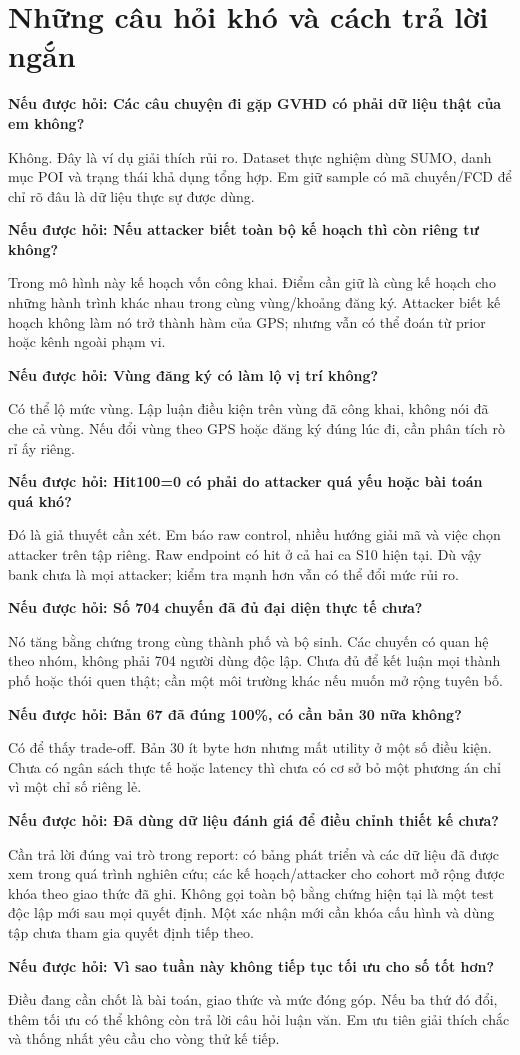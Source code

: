 \documentclass[10pt,a4paper]{article}
\newcommand{\ask}[2]{\par\textbf{Nếu được hỏi: #1}\par #2\par}
\newcommand{\guidepage}[1]{\clearpage\section{#1}}
\begin{document}
\guidepage{Những câu hỏi khó và cách trả lời ngắn}
\ask{Các câu chuyện đi gặp GVHD có phải dữ liệu thật của em không?}{Không. Đây là ví dụ giải thích rủi ro. Dataset thực nghiệm dùng SUMO, danh mục POI và trạng thái khả dụng tổng hợp. Em giữ sample có mã chuyến/FCD để chỉ rõ đâu là dữ liệu thực sự được dùng.}

\ask{Nếu attacker biết toàn bộ kế hoạch thì còn riêng tư không?}{Trong mô hình này kế hoạch vốn công khai. Điểm cần giữ là cùng kế hoạch cho những hành trình khác nhau trong cùng vùng/khoảng đăng ký. Attacker biết kế hoạch không làm nó trở thành hàm của GPS; nhưng vẫn có thể đoán từ prior hoặc kênh ngoài phạm vi.}

\ask{Vùng đăng ký có làm lộ vị trí không?}{Có thể lộ mức vùng. Lập luận điều kiện trên vùng đã công khai, không nói đã che cả vùng. Nếu đổi vùng theo GPS hoặc đăng ký đúng lúc đi, cần phân tích rò rỉ ấy riêng.}

\ask{Hit100=0 có phải do attacker quá yếu hoặc bài toán quá khó?}{Đó là giả thuyết cần xét. Em báo raw control, nhiều hướng giải mã và việc chọn attacker trên tập riêng. Raw endpoint có hit ở cả hai ca S10 hiện tại. Dù vậy bank chưa là mọi attacker; kiểm tra mạnh hơn vẫn có thể đổi mức rủi ro.}

\ask{Số 704 chuyến đã đủ đại diện thực tế chưa?}{Nó tăng bằng chứng trong cùng thành phố và bộ sinh. Các chuyến có quan hệ theo nhóm, không phải 704 người dùng độc lập. Chưa đủ để kết luận mọi thành phố hoặc thói quen thật; cần một môi trường khác nếu muốn mở rộng tuyên bố.}

\ask{Bản 67 đã đúng 100\%, có cần bản 30 nữa không?}{Có để thấy trade-off. Bản 30 ít byte hơn nhưng mất utility ở một số điều kiện. Chưa có ngân sách thực tế hoặc latency thì chưa có cơ sở bỏ một phương án chỉ vì một chỉ số riêng lẻ.}

\ask{Đã dùng dữ liệu đánh giá để điều chỉnh thiết kế chưa?}{Cần trả lời đúng vai trò trong report: có bảng phát triển và các dữ liệu đã được xem trong quá trình nghiên cứu; các kế hoạch/attacker cho cohort mở rộng được khóa theo giao thức đã ghi. Không gọi toàn bộ bằng chứng hiện tại là một test độc lập mới sau mọi quyết định. Một xác nhận mới cần khóa cấu hình và dùng tập chưa tham gia quyết định tiếp theo.}

\ask{Vì sao tuần này không tiếp tục tối ưu cho số tốt hơn?}{Điều đang cần chốt là bài toán, giao thức và mức đóng góp. Nếu ba thứ đó đổi, thêm tối ưu có thể không còn trả lời câu hỏi luận văn. Em ưu tiên giải thích chắc và thống nhất yêu cầu cho vòng thử kế tiếp.}
\end{document}
